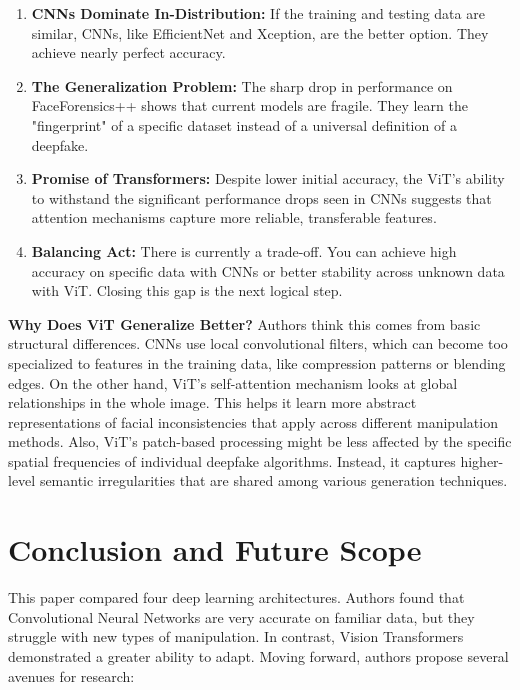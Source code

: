 \documentclass[conference]{IEEEtran}
\begin{document}
\begin{enumerate}
    \item \textbf{CNNs Dominate In-Distribution:} If the training and testing data are similar, CNNs, like EfficientNet and Xception, are the better option. They achieve nearly perfect accuracy.

    \item \textbf{The Generalization Problem:} The sharp drop in performance on FaceForensics++ shows that current models are fragile. They learn the "fingerprint" of a specific dataset instead of a universal definition of a deepfake.

    \item \textbf{Promise of Transformers:} Despite lower initial accuracy, the ViT's ability to withstand the significant performance drops seen in CNNs suggests that attention mechanisms capture more reliable, transferable features.

    \item \textbf{Balancing Act:} There is currently a trade-off. You can achieve high accuracy on specific data with CNNs or better stability across unknown data with ViT. Closing this gap is the next logical step.
\end{enumerate}

\textbf{Why Does ViT Generalize Better?} Authors think this comes from basic structural differences. CNNs use local convolutional filters, which can become too specialized to features in the training data, like compression patterns or blending edges. On the other hand, ViT's self-attention mechanism looks at global relationships in the whole image. This helps it learn more abstract representations of facial inconsistencies that apply across different manipulation methods. Also, ViT's patch-based processing might be less affected by the specific spatial frequencies of individual deepfake algorithms. Instead, it captures higher-level semantic irregularities that are shared among various generation techniques.

\section{Conclusion and Future Scope}
This paper compared four deep learning architectures. Authors found that Convolutional Neural Networks are very accurate on familiar data, but they struggle with new types of manipulation. In contrast, Vision Transformers demonstrated a greater ability to adapt.
Moving forward, authors propose several avenues for research:
\end{document}
